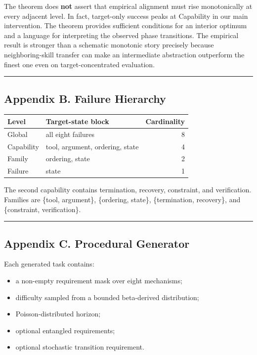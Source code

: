 \documentclass[
]{article}
\providecommand{\tightlist}{%
  \setlength{\itemsep}{0pt}\setlength{\parskip}{0pt}}
\begin{document}
The theorem does \textbf{not} assert that empirical alignment must rise
monotonically at every adjacent level. In fact, target-only success
peaks at Capability in our main intervention. The theorem provides
sufficient conditions for an interior optimum and a language for
interpreting the observed phase transitions. The empirical result is
stronger than a schematic monotonic story precisely because
neighboring-skill transfer can make an intermediate abstraction
outperform the finest one even on target-concentrated evaluation.

\begin{center}\rule{0.5\linewidth}{0.5pt}\end{center}

\subsection{Appendix B. Failure
Hierarchy}\label{appendix-b.-failure-hierarchy}

\begin{longtable}[]{@{}llr@{}}
\toprule\noalign{}
Level & Target-state block & Cardinality \\
\midrule\noalign{}
\endhead
\bottomrule\noalign{}
\endlastfoot
Global & all eight failures & 8 \\
Capability & tool, argument, ordering, state & 4 \\
Family & ordering, state & 2 \\
Failure & state & 1 \\
\end{longtable}

The second capability contains termination, recovery, constraint, and
verification. Families are \{tool, argument\}, \{ordering, state\},
\{termination, recovery\}, and \{constraint, verification\}.

\begin{center}\rule{0.5\linewidth}{0.5pt}\end{center}

\subsection{Appendix C. Procedural
Generator}\label{appendix-c.-procedural-generator}

Each generated task contains:

\begin{itemize}
\tightlist
\item
  a non-empty requirement mask over eight mechanisms;
\item
  difficulty sampled from a bounded beta-derived distribution;
\item
  Poisson-distributed horizon;
\item
  optional entangled requirements;
\item
  optional stochastic transition requirement.
\end{itemize}
\end{document}
